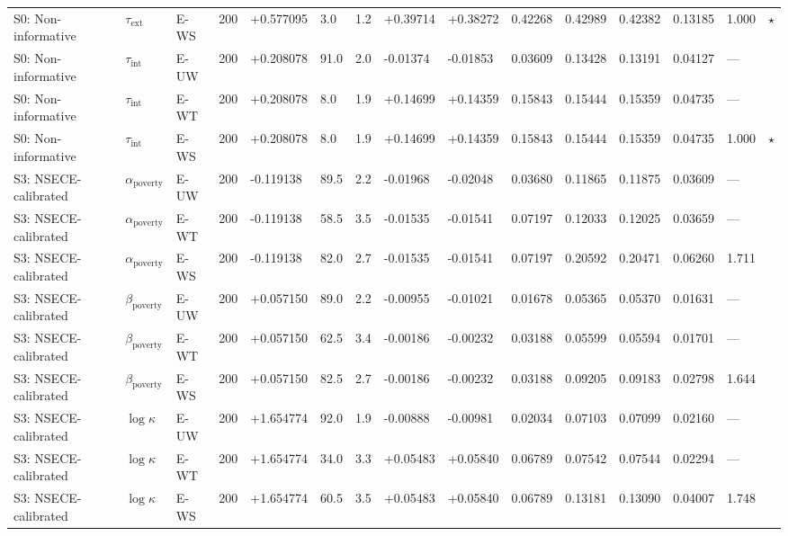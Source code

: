 \begin{table}[htbp]
\begin{tabular}{lllrlllllllllll}
  S0: Non-informative & $\tau_{\text{ext}}$ & E-WS & 200 & +0.577095 & 3.0 & 1.2 & +0.39714 & +0.38272 & 0.42268 & 0.42989 & 0.42382 & 0.13185 & 1.000 & $\star$ \\ 
  S0: Non-informative & $\tau_{\text{int}}$ & E-UW & 200 & +0.208078 & 91.0 & 2.0 & -0.01374 & -0.01853 & 0.03609 & 0.13428 & 0.13191 & 0.04127 & --- &  \\ 
  S0: Non-informative & $\tau_{\text{int}}$ & E-WT & 200 & +0.208078 & 8.0 & 1.9 & +0.14699 & +0.14359 & 0.15843 & 0.15444 & 0.15359 & 0.04735 & --- &  \\ 
  S0: Non-informative & $\tau_{\text{int}}$ & E-WS & 200 & +0.208078 & 8.0 & 1.9 & +0.14699 & +0.14359 & 0.15843 & 0.15444 & 0.15359 & 0.04735 & 1.000 & $\star$ \\ 
  S3: NSECE-calibrated & $\alpha_{\text{poverty}}$ & E-UW & 200 & -0.119138 & 89.5 & 2.2 & -0.01968 & -0.02048 & 0.03680 & 0.11865 & 0.11875 & 0.03609 & --- &  \\ 
  S3: NSECE-calibrated & $\alpha_{\text{poverty}}$ & E-WT & 200 & -0.119138 & 58.5 & 3.5 & -0.01535 & -0.01541 & 0.07197 & 0.12033 & 0.12025 & 0.03659 & --- &  \\ 
  S3: NSECE-calibrated & $\alpha_{\text{poverty}}$ & E-WS & 200 & -0.119138 & 82.0 & 2.7 & -0.01535 & -0.01541 & 0.07197 & 0.20592 & 0.20471 & 0.06260 & 1.711 &  \\ 
  S3: NSECE-calibrated & $\beta_{\text{poverty}}$ & E-UW & 200 & +0.057150 & 89.0 & 2.2 & -0.00955 & -0.01021 & 0.01678 & 0.05365 & 0.05370 & 0.01631 & --- &  \\ 
  S3: NSECE-calibrated & $\beta_{\text{poverty}}$ & E-WT & 200 & +0.057150 & 62.5 & 3.4 & -0.00186 & -0.00232 & 0.03188 & 0.05599 & 0.05594 & 0.01701 & --- &  \\ 
  S3: NSECE-calibrated & $\beta_{\text{poverty}}$ & E-WS & 200 & +0.057150 & 82.5 & 2.7 & -0.00186 & -0.00232 & 0.03188 & 0.09205 & 0.09183 & 0.02798 & 1.644 &  \\ 
  S3: NSECE-calibrated & $\log\kappa$ & E-UW & 200 & +1.654774 & 92.0 & 1.9 & -0.00888 & -0.00981 & 0.02034 & 0.07103 & 0.07099 & 0.02160 & --- &  \\ 
  S3: NSECE-calibrated & $\log\kappa$ & E-WT & 200 & +1.654774 & 34.0 & 3.3 & +0.05483 & +0.05840 & 0.06789 & 0.07542 & 0.07544 & 0.02294 & --- &  \\ 
  S3: NSECE-calibrated & $\log\kappa$ & E-WS & 200 & +1.654774 & 60.5 & 3.5 & +0.05483 & +0.05840 & 0.06789 & 0.13181 & 0.13090 & 0.04007 & 1.748 &  \\ 

\end{tabular}
\end{table}
